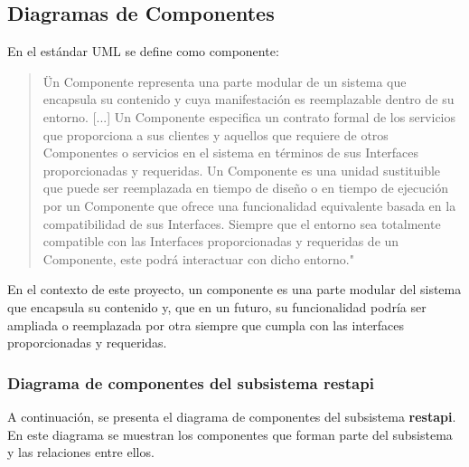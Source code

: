 \subsection{Diagramas de Componentes}
En el estándar UML se define como componente: 
\begin{quote}
    \"Un Componente representa una parte modular de un sistema que encapsula su contenido y cuya manifestación es reemplazable dentro de su entorno.
[...]
Un Componente especifica un contrato formal de los servicios que proporciona a sus clientes y aquellos que requiere de otros Componentes o servicios en el sistema en términos de sus Interfaces proporcionadas y requeridas.
Un Componente es una unidad sustituible que puede ser reemplazada en tiempo de diseño o en tiempo de ejecución por un Componente que ofrece una funcionalidad equivalente basada en la compatibilidad de sus Interfaces. 
Siempre que el entorno sea totalmente compatible con las Interfaces proporcionadas y requeridas de un Componente, este podrá interactuar con dicho entorno."
\end{quote}

\begin{flushright}
    \cite[p. 209]{UMLomg2017}
\end{flushright}

En el contexto de este proyecto, un componente es una parte modular del sistema que encapsula su contenido y, que en un futuro, su funcionalidad podría ser ampliada o reemplazada por otra siempre que cumpla con las interfaces proporcionadas y requeridas.

\subsubsection{Diagrama de componentes del subsistema restapi}
A continuación, se presenta el diagrama de componentes del subsistema \textbf{restapi}. En este diagrama se muestran los componentes que forman parte del subsistema y las relaciones entre ellos.

